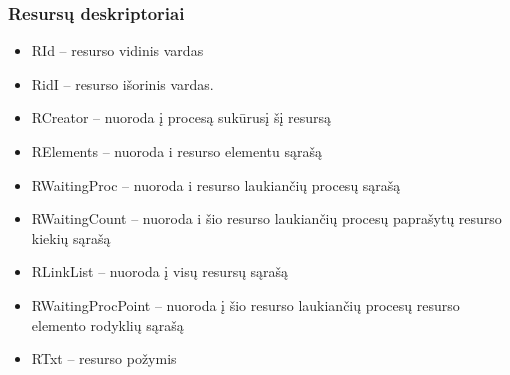 \subsubsection{Resursų deskriptoriai}
\begin{itemize}
	\item RId  – resurso vidinis vardas
	\item RidI – resurso išorinis vardas.
	\item RCreator – nuoroda į procesą sukūrusį šį resursą
	\item RElements – nuoroda i resurso elementu sąrašą
	\item RWaitingProc – nuoroda i resurso laukiančių procesų sąrašą
	\item RWaitingCount – nuoroda i šio resurso laukiančių procesų paprašytų resurso kiekių sąrašą
	\item RLinkList – nuoroda į visų resursų sąrašą
	\item RWaitingProcPoint – nuoroda į šio resurso laukiančių procesų resurso elemento rodyklių sąrašą
	\item RTxt – resurso požymis
\end{itemize}